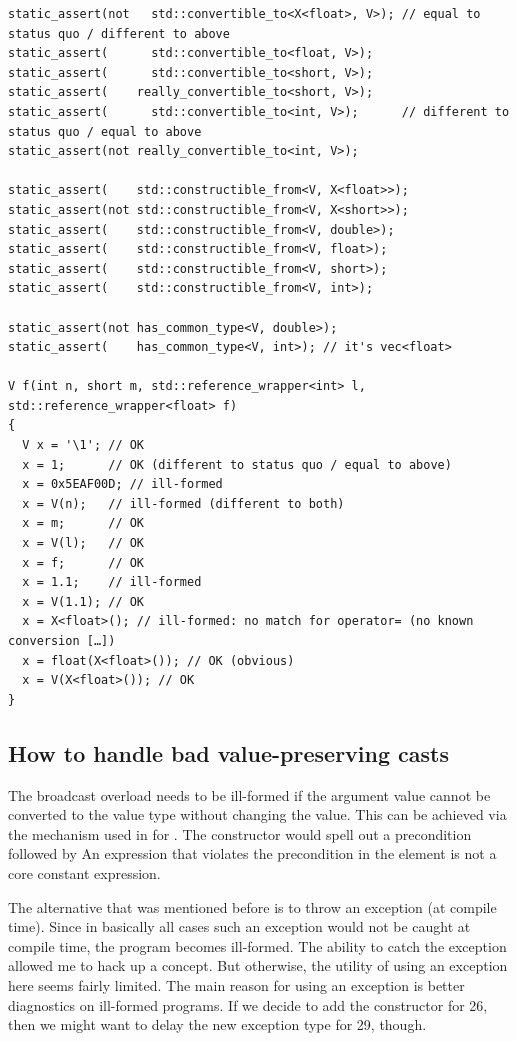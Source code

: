 \bigskip
\begin{lstlisting}[style=Vc]
static_assert(not   std::convertible_to<X<float>, V>); // equal to status quo / different to above
static_assert(      std::convertible_to<float, V>);
static_assert(      std::convertible_to<short, V>);
static_assert(    really_convertible_to<short, V>);
static_assert(      std::convertible_to<int, V>);      // different to status quo / equal to above
static_assert(not really_convertible_to<int, V>);

static_assert(    std::constructible_from<V, X<float>>);
static_assert(not std::constructible_from<V, X<short>>);
static_assert(    std::constructible_from<V, double>);
static_assert(    std::constructible_from<V, float>);
static_assert(    std::constructible_from<V, short>);
static_assert(    std::constructible_from<V, int>);

static_assert(not has_common_type<V, double>);
static_assert(    has_common_type<V, int>); // it's vec<float>

V f(int n, short m, std::reference_wrapper<int> l, std::reference_wrapper<float> f)
{
  V x = '\1'; // OK
  x = 1;      // OK (different to status quo / equal to above)
  x = 0x5EAF00D; // ill-formed
  x = V(n);   // ill-formed (different to both)
  x = m;      // OK
  x = V(l);   // OK
  x = f;      // OK
  x = 1.1;    // ill-formed
  x = V(1.1); // OK
  x = X<float>(); // ill-formed: no match for operator= (no known conversion […])
  x = float(X<float>()); // OK (obvious)
  x = V(X<float>()); // OK
}
\end{lstlisting}

\subsection{How to handle bad value-preserving casts}\label{sec:exceptions}

The  broadcast overload needs to be ill-formed if the argument value cannot be
converted to the value type without changing the value.
This can be achieved via the mechanism used in  for .
The constructor would spell out a precondition followed by \remarks An expression that violates
the precondition in the \expects element is not a core constant expression.

The alternative that was mentioned before is to throw an exception (at compile time).
Since in basically all cases such an exception would not be caught at compile time, the program
becomes ill-formed.
The ability to catch the exception allowed me to hack up a  concept.
But otherwise, the utility of using an exception here seems fairly limited.
The main reason for using an exception is better diagnostics on ill-formed programs.
If we decide to add the  constructor for \CC{}26, then we might want to delay the
new exception type for \CC{}29, though.

